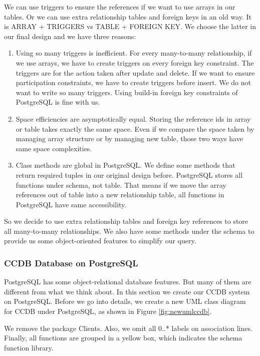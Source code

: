 \documentclass[11pt]{article}
\begin{document}
\par
We can use triggers to ensure the references if we want to use arrays in our tables. Or we can use extra relationship tables and foreign keys in an old way. It is ARRAY + TRIGGERS vs TABLE + FOREIGN KEY. We choose the latter in our final design and we have three reasons:
\par
\begin{enumerate}
\item Using so many triggers is inefficient. For every many-to-many relationship, if we use arrays, we have to create triggers on every foreign key constraint. The triggers are for the action taken after update and delete. If we want to ensure participation constraints, we have to create triggers before insert. We do not want to write so many triggers. Using build-in foreign key constraints of PostgreSQL is fine with us.
\item Space efficiencies are asymptotically equal. Storing the reference ids in array or table takes exactly the same space. Even if we compare the space taken by managing array structure or by managing new table, those two ways have same space complexities.
\item Class methods are global in PostgreSQL. We define some methods that return required tuples in our original design before. PostgreSQL stores all functions under schema, not table. That means if we move the array references out of table into a new relationship table, all functions in PostgreSQL have same accessibility.
\end{enumerate}
\par
So we decide to use extra relationship tables and foreign key references to store all many-to-many relationships. We also have some methods under the schema to provide us some object-oriented features to simplify our query.

\subsubsection{CCDB Database on PostgreSQL}
\par
PostgreSQL has some object-relational database features. But many of them are different from what we think about. In this section we create our CCDB system on PostgreSQL. Before we go into details, we create a new UML class diagram for CCDB under PostgreSQL, as shown in Figure \ref{fig:newumlccdb}.
\par
We remove the package Clients. Also, we omit all 0..* labels on association lines. Finally, all functions are grouped in a yellow box, which indicates the schema function library.
\end{document}
